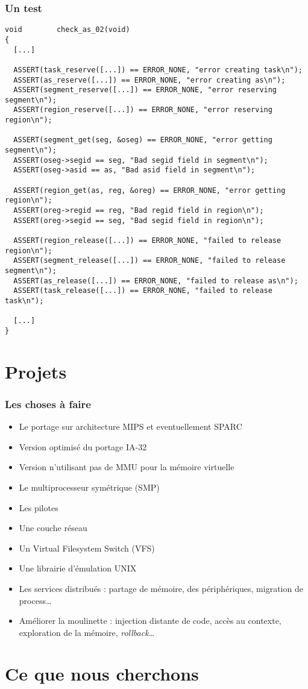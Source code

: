 
\begin{frame}[containsverbatim]
  \frametitle{Un test}

  \begin{verbatim}
void		check_as_02(void)
{
  [...]

  ASSERT(task_reserve([...]) == ERROR_NONE, "error creating task\n");
  ASSERT(as_reserve([...]) == ERROR_NONE, "error creating as\n");
  ASSERT(segment_reserve([...]) == ERROR_NONE, "error reserving segment\n");
  ASSERT(region_reserve([...]) == ERROR_NONE, "error reserving region\n");

  ASSERT(segment_get(seg, &oseg) == ERROR_NONE, "error getting segment\n");
  ASSERT(oseg->segid == seg, "Bad segid field in segment\n");
  ASSERT(oseg->asid == as, "Bad asid field in segment\n");

  ASSERT(region_get(as, reg, &oreg) == ERROR_NONE, "error getting region\n");
  ASSERT(oreg->regid == reg, "Bad regid field in region\n");
  ASSERT(oreg->segid == seg, "Bad segid field in region\n");

  ASSERT(region_release([...]) == ERROR_NONE, "failed to release region\n");
  ASSERT(segment_release([...]) == ERROR_NONE, "failed to release segment\n");
  ASSERT(as_release([...]) == ERROR_NONE, "failed to release as\n");
  ASSERT(task_release([...]) == ERROR_NONE, "failed to release task\n");

  [...]
}
  \end{verbatim}

\end{frame}

%
%

\section{Projets}

\begin{frame}
  \frametitle{Les choses \`{a} faire}

  \begin{itemize}
  \item
    Le portage sur architecture MIPS et eventuellement SPARC
  \item
    Version optimis\'{e} du portage IA-32
  \item
    Version n'utilisant pas de MMU pour la m\'{e}moire virtuelle
  \item
    Le multiprocesseur sym\'{e}trique (SMP)
  \item
    Les pilotes
  \item
    Une couche r\'{e}seau
  \item
    Un Virtual Filesystem Switch (VFS)
  \item
    Une librairie d'\'{e}mulation UNIX
  \item
    Les services distribu\'{e}s : partage de m\'{e}moire, des
    p\'{e}riph\'{e}riques, migration de process\ldots
  \item
    Am\'{e}liorer la moulinette : injection distante de code, acc\`{e}s au
    contexte, exploration de la m\'{e}moire, \emph{rollback}\ldots
  \end{itemize}

\end{frame}

%
%

\section{Ce que nous cherchons}


